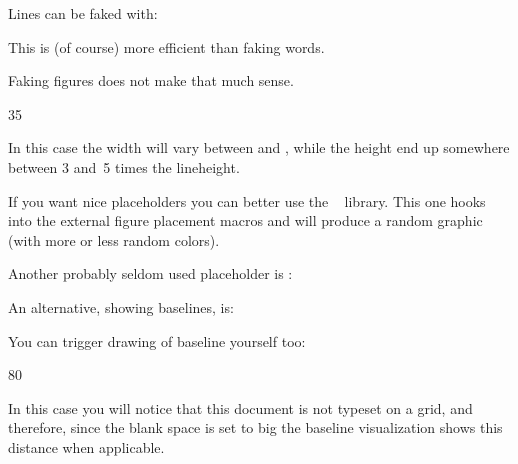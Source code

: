\subject{Faking lines}

Lines can be faked with:

\startbuffer
{}
\stopbuffer

\typebuffer \getbuffer

This is (of course) more efficient than faking words.

\subject{Faking figures}

Faking figures does not make that much sense.

\startbuffer
\fakefigure
  [left][]
  {10em}{12em}
  {3\lineheight}{5\lineheight}

\stopbuffer

\typebuffer \getbuffer

In this case the width will vary between \type {10em} and \type {12em}, while the
height end up somewhere between 3 and~5 times the lineheight.

If you want nice placeholders you can better use the \METAPOST\ 
library. This one hooks into the external figure placement macros and will
produce a random graphic (with more or less random colors).

\startbuffer
\useMPlibrary[dum]
  {\externalfigure[ForTheMomentFaked][width=3cm,height=2cm]}

\stopbuffer

\typebuffer \getbuffer

\subject{Faking formulas}

Another probably seldom used placeholder is \type {\fakeformula}:

\startbuffer
\startformula \fakeformula \stopformula
\stopbuffer

\typebuffer \getbuffer

An alternative, showing baselines, is:

\startbuffer
\startformula \fakespacingformula \stopformula
\stopbuffer

\typebuffer \getbuffer

You can trigger drawing of baseline yourself too:

\startbuffer
\showbaselines
{} \par
{} {80} \par
{}
\stopbuffer

\typebuffer \bgroup \getbuffer \egroup

In this case you will notice that this document is not typeset on a grid, and
therefore, since the blank space is set to big the baseline visualization shows
this distance when applicable.

\stopdocument
